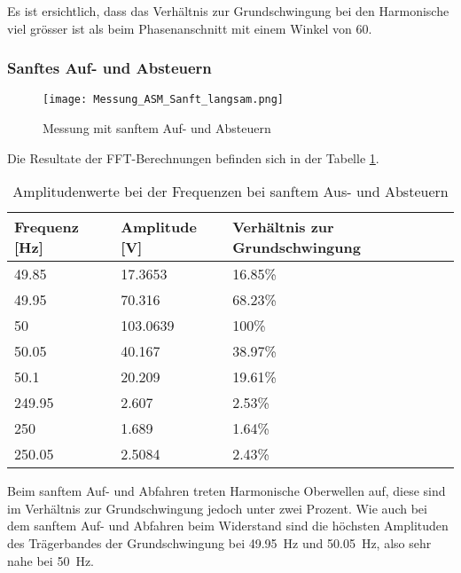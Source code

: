 Es ist ersichtlich, dass das Verhältnis zur Grundschwingung bei den Harmonische viel grösser ist als beim Phasenanschnitt mit einem Winkel von 60\textdegree. 

\newpage
\subsubsection*{Sanftes Auf- und Absteuern}
\begin{figure}[ht!]
	\centering
	\texttt{[image: Messung\_ASM\_Sanft\_langsam.png]}	
	\caption{Messung mit sanftem Auf- und Absteuern}\label{fig:Mess_ASM_Sanft_langsam}
\end{figure}

Die Resultate der FFT-Berechnungen befinden sich in der Tabelle \ref{tab:Mess_Spannung_ASM_AufAb_sanft}. 


\begin{table}[ht!]
	\centering
	\begin{tabular}{|l|l|l|}
		\hline
		Frequenz {[}Hz{]} & Amplitude {[}V{]} & Verhältnis zur Grundschwingung \\ \hline
		49.85             & 17.3653           & 16.85\%                        \\ \hline
		49.95             & 70.316            & 68.23\%                        \\ \hline
		50                & 103.0639          & 100\%                          \\ \hline
		50.05             & 40.167            & 38.97\%                        \\ \hline
		50.1              & 20.209            & 19.61\%                        \\ \hline
		249.95            & 2.607             & 2.53\%                         \\ \hline
		250               & 1.689             & 1.64\%                         \\ \hline
		250.05            & 2.5084            & 2.43\%                         \\ \hline
	\end{tabular}
\caption{Amplitudenwerte bei der Frequenzen bei sanftem Aus- und Absteuern}\label{tab:Mess_Spannung_ASM_AufAb_sanft}
\end{table}

Beim sanftem Auf- und Abfahren treten Harmonische Oberwellen auf, diese sind im Verhältnis zur Grundschwingung jedoch unter zwei Prozent. Wie auch bei dem sanftem Auf- und Abfahren beim Widerstand sind die höchsten Amplituden des Trägerbandes der Grundschwingung bei \SI{49.95}{Hz} und \SI{50.05}{Hz}, also sehr nahe bei \SI{50}{Hz}.

